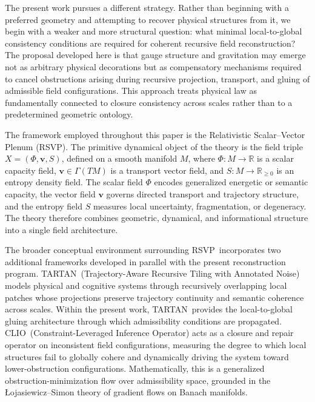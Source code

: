 \documentclass[12pt,a4paper]{article}
\newcommand{\RSVP}{\textrm{RSVP}}
\newcommand{\CLIO}{\textrm{CLIO}}
\newcommand{\TARTAN}{\textrm{TARTAN}}
\newcommand{\R}{\mathbb{R}}
\begin{document}
The present work pursues a different strategy. Rather than beginning with a
preferred geometry and attempting to recover physical structures from it, we
begin with a weaker and more structural question: what minimal local-to-global
consistency conditions are required for coherent recursive field reconstruction?
The proposal developed here is that gauge structure and gravitation may emerge
not as arbitrary physical decorations but as compensatory mechanisms required to
cancel obstructions arising during recursive projection, transport, and gluing
of admissible field configurations. This approach treats physical law as
fundamentally connected to closure consistency across scales rather than to a
predetermined geometric ontology.

The framework employed throughout this paper is the Relativistic Scalar--Vector
Plenum (\RSVP). The primitive dynamical object of the theory is the field triple
$X=(\Phi,\mathbf{v},S)$, defined on a smooth manifold $M$, where $\Phi: M\to\R$
is a scalar capacity field, $\mathbf{v}\in\Gamma(TM)$ is a transport vector
field, and $S: M\to\R_{\geq 0}$ is an entropy density field. The scalar field
$\Phi$ encodes generalized energetic or semantic capacity, the vector field
$\mathbf{v}$ governs directed transport and trajectory structure, and the
entropy field $S$ measures local uncertainty, fragmentation, or degeneracy. The
theory therefore combines geometric, dynamical, and informational structure into
a single field architecture.

The broader conceptual environment surrounding \RSVP\ incorporates two
additional frameworks developed in parallel with the present reconstruction
program. \TARTAN\ (Trajectory-Aware Recursive Tiling with Annotated Noise)
models physical and cognitive systems through recursively overlapping local
patches whose projections preserve trajectory continuity and semantic coherence
across scales. Within the present work, \TARTAN\ provides the local-to-global
gluing architecture through which admissibility conditions are propagated.
\CLIO\ (Constraint-Leveraged Inference Operator) acts as a closure and repair
operator on inconsistent field configurations, measuring the degree to which
local structures fail to globally cohere and dynamically driving the system
toward lower-obstruction configurations. Mathematically, this is a generalized
obstruction-minimization flow over admissibility space, grounded in the
Łojasiewicz--Simon theory of gradient flows on Banach manifolds.
\end{document}
